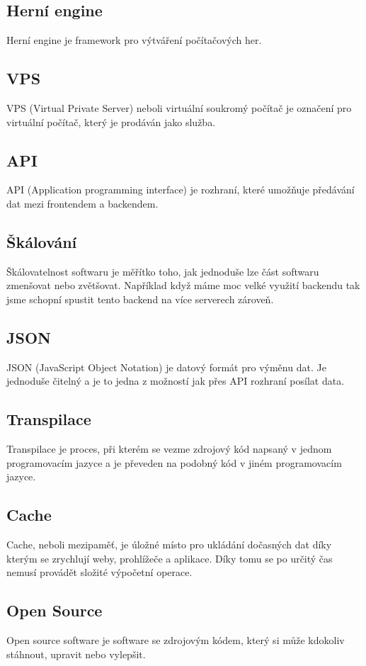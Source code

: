 \subsection{Herní engine}
Herní engine je framework pro výtváření počítačových her.

\subsection{VPS}
VPS (Virtual Private Server) neboli virtuální soukromý počítač je označení pro virtuální počítač, který je prodáván jako služba.

\subsection{API}
API (Application programming interface) je rozhraní, které umožňuje předávání dat mezi frontendem a backendem.

\subsection{Škálování}
Škálovatelnost softwaru je měřítko toho, jak jednoduše lze část softwaru zmenšovat nebo zvětšovat. \cite{Skalovani} Například když máme moc velké využití backendu tak jsme schopní spustit tento backend na více serverech zároveň.

\subsection{JSON}
JSON (JavaScript Object Notation) je datový formát pro výměnu dat. Je jednoduše čitelný a je to jedna z možností jak přes API rozhraní posílat data. \cite{JSON}

\subsection{Transpilace}
Transpilace je proces, při kterém se vezme zdrojový kód napsaný v jednom programovacím jazyce a je převeden na podobný kód v jiném programovacím jazyce. \cite{Transpilace}

\subsection{Cache}
Cache, neboli mezipaměť, je úložné místo pro ukládání dočasných dat díky kterým se zrychlují weby, prohlížeče a aplikace. \cite{Cache} Díky tomu se po určitý čas nemusí provádět složité výpočetní operace.

\subsection{Open Source}
Open source software je software se zdrojovým kódem, který si může kdokoliv stáhnout, upravit nebo vylepšit. \cite{OpenSource}
